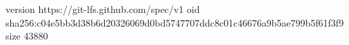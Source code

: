 version https://git-lfs.github.com/spec/v1
oid sha256:c04e5bb3d38b6d20326069d0bd5747707ddc8c01c46676a9b5ae799b5f61f3f9
size 43880
